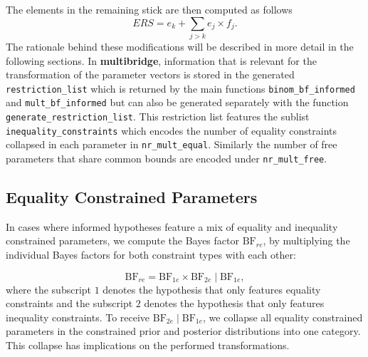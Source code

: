 \documentclass[
  english,
  man,floatsintext]{apa6}
\begin{document}
The elements in the remaining stick are then computed as follows
\[ERS = e_k + \sum_{j > k} e_j \times f_j.\] The rationale behind these
modifications will be described in more detail in the following
sections. In \textbf{multibridge}, information that is relevant for the
transformation of the parameter vectors is stored in the generated
\texttt{restriction\_list} which is returned by the main functions
\texttt{binom\_bf\_informed} and \texttt{mult\_bf\_informed} but can
also be generated separately with the function
\texttt{generate\_restriction\_list}. This restriction list features the
sublist \texttt{inequality\_constraints} which encodes the number of
equality constraints collapsed in each parameter in
\texttt{nr\_mult\_equal}. Similarly the number of free parameters that
share common bounds are encoded under \texttt{nr\_mult\_free}.

\hypertarget{equality-constrained-parameters}{%
\subsection{Equality Constrained Parameters}\label{equality-constrained-parameters}}

In cases where informed hypotheses feature a mix of equality and
inequality constrained parameters, we compute the Bayes factor
\(\text{BF}_{re}\), by multiplying the individual Bayes factors for both
constraint types with each other:

\[
\text{BF}_{re}
= \text{BF}_{1e} \times \text{BF}_{2e} \mid \text{BF}_{1e},
\]
where the subscript \(1\) denotes the hypothesis that only features
equality constraints and the subscript \(2\) denotes the hypothesis that
only features inequality constraints. To receive
\(\text{BF}_{2e} \mid \text{BF}_{1e}\), we collapse all equality
constrained parameters in the constrained prior and posterior
distributions into one category. This collapse has implications on the
performed transformations.
\end{document}
